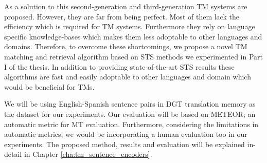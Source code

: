 As a solution to this second-generation and third-generation TM systems are proposed. However, they are far from being perfect. Most of them lack the efficiency which is required for TM systems. Furthermore they rely on language specific knowledge-bases which makes them less adoptable to other languages and domains. Therefore, to overcome these shortcomings, we propose a novel TM matching and retrieval algorithm based on STS methods we experimented in Part I of the thesis. In addition to providing state-of-the-art STS results these algorithms are fast and easily adoptable to other languages and domain which would be beneficial for TMs. 

We will be using English-Spanish sentence pairs in DGT translation memory as the dataset for our experiments. Our evaluation will be based on METEOR; an automatic metric for MT evaluation. Furthermore, considering the limitations in automatic metrics, we would be incorporating a human evaluation too in our experiments. The proposed method, results and evaluation will be explained in-detail in Chapter \ref{cha:tm_sentence_encoders}.







